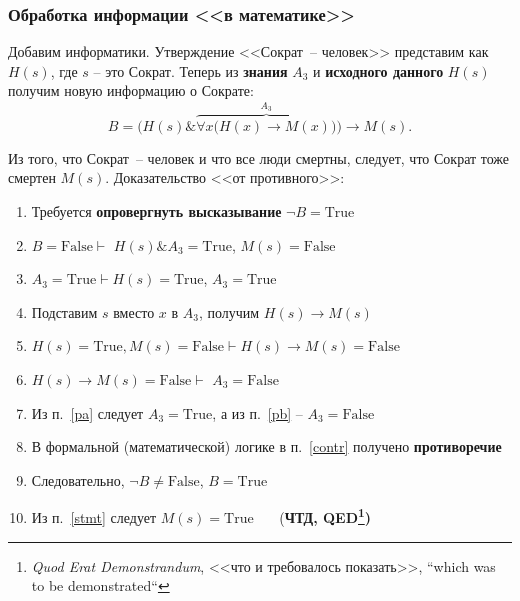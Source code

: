 \documentclass[10pt]{beamer}
\newcommand{\Tr}{\mbox{True}}
\newcommand{\Fa}{\mbox{False}}
\begin{document}
\begin{frame}[fragile]
  \frametitle{Обработка информации <<в математике>>}
\small
Добавим информатики. Утверждение <<Сократ~-- человек>> представим как $H(s)$, где $s$ -- это Сократ.  Теперь из \textbf{знания} $A_3$ и \textbf{исходного данного} $H(s)$ получим новую информацию о Сократе:
$$
B = \Big (H(s) \& \overbrace{\forall x \big ( H(x)\to M(x)\big )}^{A_3} \Big ) \to M(s).
$$

Из того, что Сократ~-- человек и что все люди смертны, следует, что Сократ тоже смертен $M(s)$.  Доказательство <<от противного>>:

\begin{enumerate}
\item Требуется \textbf{опровергнуть высказывание} $\neg B = \Tr$
\item $B = \Fa \vdash$ $H(s) \& A_3 = \Tr$, $M(s) = \Fa$
\item $A_3 = \Tr \vdash H(s) = \Tr$, {\color{red}$A_3 = \Tr$} \label{pa}
\item Подставим $s$ вместо $x$ в $A_3$, получим $H(s)\to M(s)$
\item $H(s)= \Tr, M(s)= \Fa \vdash H(s)\to M(s) = \Fa$
\item $H(s)\to M(s) = \Fa\vdash$ {\color{blue} $A_3 = \Fa$} \label{pb}
\item Из п.~\ref{pa} следует {\color{red}$A_3 = \Tr$}, а из п.~\ref{pb} -- {\color{blue} $A_3 = \Fa$} \label{contr}
\item В формальной (математической) логике в п.~\ref{contr} получено \textbf{противоречие}
\item Следовательно, $\neg B \neq \Fa$, $B = \Tr$ \label{stmt}
\item Из п.~\ref{stmt} следует $M(s)=\Tr$ \square\ \ \ (\textbf{ЧТД, QED\footnote{\emph{Quod Erat Demonstrandum}, <<что и требовалось показать>>, ``which was to be demonstrated``})}
\end{enumerate}
\end{frame}
\end{document}
